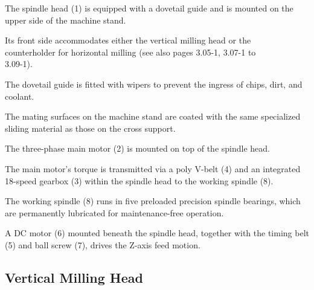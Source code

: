 \vspace{1cm}

\noindent The spindle head (1) is equipped with a dovetail guide and is mounted on the upper side of the machine stand.

\vspace{.3cm}

\noindent Its front side accommodates either the vertical milling head or the \\counterholder for horizontal milling (see also pages 3.05-1, 3.07-1 to \\3.09-1).

\vspace{.3cm}

\noindent The dovetail guide is fitted with wipers to prevent the ingress of chips, dirt, and coolant.

\vspace{.3cm}

\noindent The mating surfaces on the machine stand are coated with the same specialized sliding material as those on the cross support.

\vspace{.3cm}

\noindent The three-phase main motor (2) is mounted on top of the spindle head.

\vspace{.3cm}

\noindent The main motor's torque is transmitted via a poly V-belt (4) and an integrated 18-speed gearbox (3) within the spindle head to the working spindle (8).

\vspace{.3cm}

\noindent The working spindle (8) runs in five preloaded precision spindle bearings, which are permanently lubricated for maintenance-free operation.

\vspace{.3cm}

\noindent A DC motor (6) mounted beneath the spindle head, together with the timing belt (5) and ball screw (7), drives the Z-axis feed motion.

\vfill
\clearpage

\subsection{Vertical Milling Head}

